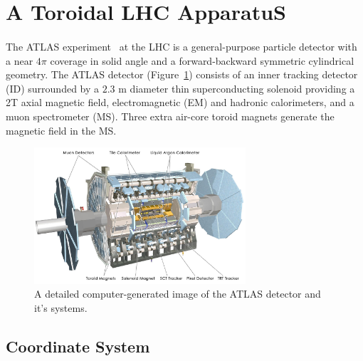 \section{A Toroidal LHC ApparatuS}
\label{sec:ATLAS}

\paragraph{}
The ATLAS experiment~\cite{PERF-2007-01} at the LHC is a general-purpose particle detector with a near $4\pi$ coverage in solid angle and a forward-backward symmetric cylindrical geometry. 
The ATLAS detector (Figure~\ref{fig:ATLAS}) consists of an inner tracking detector (ID) surrounded by a $2.3$ m diameter thin superconducting solenoid providing a 2T axial magnetic field, electromagnetic (EM) and hadronic calorimeters, and a muon spectrometer (MS). Three extra air-core toroid magnets generate the magnetic field in the MS. 

\begin{figure}[h!]
  \centering
  \captionsetup{justification=centering}
  \includegraphics[width=0.7\textwidth]{figures/detector/ATLAS.jpg}
   \caption{A detailed computer-generated image of the ATLAS detector and it's systems.}
  \label{fig:ATLAS}
\end{figure}

\subsection{Coordinate System}
\label{sec:ATLAS-coord}
